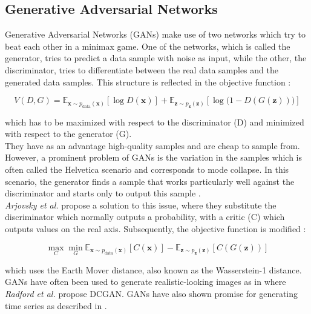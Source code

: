 \subsection{Generative Adversarial Networks}

Generative Adversarial Networks (GANs) make use of two networks which try to beat each other in a minimax game. One of the networks, which is called the generator, tries to predict a data sample with noise as input, while the other, the discriminator, tries to differentiate between the real data samples and the generated data samples. This structure is reflected in the objective function \cite{goodfellowGenerativeAdversarialNetworks2014}:

\begin{equation}
V(D, G) = \mathbb{E}_{\mathbf{x} \sim p_{\text{data}}(\mathbf{x})} \left[ \log D(\mathbf{x}) \right] + \mathbb{E}_{\mathbf{z} \sim p_\mathbf{z}(\mathbf{z})} \left[ \log \big( 1 - D(G(\mathbf{z})) \big) \right]
\end{equation}

\noindent which has to be maximized with respect to the discriminator (D) and minimized with respect to the generator (G). 
\\
They have as an advantage high-quality samples and are cheap to sample from. However, a prominent problem of GANs is the variation in the samples which is often called the Helvetica scenario and corresponds to mode collapse. In this scenario, the generator finds a sample that works particularly well against the discriminator and starts only to output this sample \cite{goodfellowGenerativeAdversarialNetworks2014}. 
\\
\textit{Arjovsky et al.} \cite{arjovskyWassersteinGAN2017} propose a solution to this issue, where they substitute the discriminator which normally outputs a probability, with a critic (C) which outputs values on the real axis. Subsequently, the objective function is modified \cite{arjovskyWassersteinGAN2017}:

\begin{equation}
\max_C \min_G \mathbb{E}_{\mathbf{x} \sim p_{\text{data}}(\mathbf{x})} \left[ C(\mathbf{x}) \right] - \mathbb{E}_{\mathbf{z} \sim p_\mathbf{z}(\mathbf{z})} \left[ C(G(\mathbf{z})) \right]
\end{equation}

\noindent which uses the Earth Mover distance, also known as the Wasserstein-1 distance. 
\\
GANs have often been used to generate realistic-looking images as in \cite{radfordUnsupervisedRepresentationLearning2016} where \textit{Radford et al.} propose DCGAN. GANs have also shown promise for generating time series as described in \cite{estebanRealvaluedMedicalTime2017, mogrenCRNNGANContinuousRecurrent2016}.

